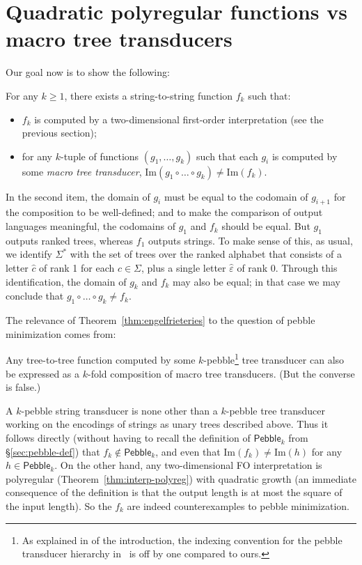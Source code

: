 \documentclass{fundam}
\newcommand{\Image}{\mathrm{Im}}
\newcommand{\Pebble}{\mathsf{Pebble}}
\theoremstyle{claimstyle}
\begin{document}
\section{Quadratic polyregular functions vs macro tree transducers}
\label{sec:engelfrieteries}

Our goal now is to show the following:
\begin{theorem}\label{thm:engelfrieteries}
  For any $k\geq1$, there exists a string-to-string function $f_k$ such that:
  \begin{itemize}
    \item $f_k$ is computed by a two-dimensional first-order interpretation (see
      the previous section);
    \item for any $k$-tuple of functions $(g_1, \dots, g_k)$ such that each $g_i$ is computed by some \emph{macro tree transducer}, $\Image(g_1 \circ \dots \circ g_k) \neq \Image(f_k)$.
  \end{itemize}
\end{theorem}
In the second item, the domain of $g_i$ must be equal to the codomain of $g_{i+1}$ for the composition to be well-defined; and to make the comparison of output languages meaningful, the codomains of $g_1$ and $f_k$ should be equal.
%
But $g_1$ outputs ranked trees, whereas $f_1$ outputs strings. To make sense of this, as usual, we identify $\Sigma^*$ with the set of trees over the ranked alphabet that consists of a letter $\widehat{c}$ of rank 1 for each $c\in\Sigma$, plus a single letter $\widehat{\varepsilon}$ of rank $0$. Through this identification, the domain of $g_k$ and $f_k$ may also be equal; in that case we may conclude that $g_1 \circ \dots \circ g_k \neq f_k$.

The relevance of Theorem~\ref{thm:engelfrieteries} to the question of pebble minimization comes from:
\begin{theorem}
  \label{thm:pebble-to-macro}
  Any tree-to-tree function computed by some $k$-pebble\footnote{As explained in  of the introduction, the indexing convention for the pebble transducer hierarchy in~\cite{EngelfrietPebbleMacro} is off by one compared to ours.} tree transducer can also be expressed as a $k$-fold composition of macro tree transducers. (But the converse is false.)
\end{theorem}

A $k$-pebble string transducer is none other than a $k$-pebble tree transducer working on the encodings of strings as unary trees described above. Thus it follows directly (without having to recall the definition of $\Pebble_k$ from \S\ref{sec:pebble-def}) that $f_k\notin\Pebble_k$, and even that $\Image(f_k)\neq\Image(h)$ for any $h\in\Pebble_k$.
%
On the other hand, any two-dimensional FO interpretation is polyregular
(Theorem~\ref{thm:interp-polyreg}) with quadratic growth (an immediate
consequence of the definition is that the output length is at most the square of
the input length). So the $f_k$ are indeed counterexamples to pebble
minimization.
\end{document}
